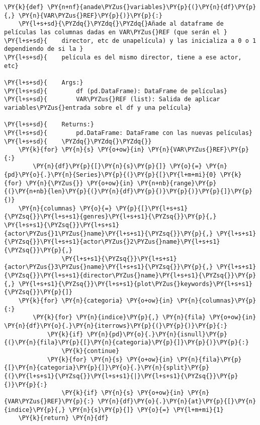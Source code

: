     \begin{tcolorbox}[breakable, size=fbox, boxrule=1pt, pad at break*=1mm,colback=cellbackground, colframe=cellborder]
\begin{Verbatim}[commandchars=\\\{\}]
\PY{k}{def} \PY{n+nf}{anade\PYZus{}variables}\PY{p}{(}\PY{n}{df}\PY{p}{,} \PY{n}{VAR\PYZus{}REF}\PY{p}{)}\PY{p}{:}
    \PY{l+s+sd}{\PYZdq{}\PYZdq{}\PYZdq{}Añade al dataframe de películas las columnas dadas en VAR\PYZus{}REF (que serán el }
\PY{l+s+sd}{    director, etc de unapelícula) y las inicializa a 0 o 1 dependiendo de si la }
\PY{l+s+sd}{    película es del mismo director, tiene a ese actor, etc}

\PY{l+s+sd}{    Args:}
\PY{l+s+sd}{        df (pd.DataFrame): DataFrame de películas}
\PY{l+s+sd}{        VAR\PYZus{}REF (list): Salida de aplicar variables\PYZus{}entrada sobre el df y una película}

\PY{l+s+sd}{    Returns:}
\PY{l+s+sd}{        pd.DataFrame: DataFrame con las nuevas películas}
\PY{l+s+sd}{    \PYZdq{}\PYZdq{}\PYZdq{}}
    \PY{k}{for} \PY{n}{s} \PY{o+ow}{in} \PY{n}{VAR\PYZus{}REF}\PY{p}{:} 
        \PY{n}{df}\PY{p}{[}\PY{n}{s}\PY{p}{]} \PY{o}{=} \PY{n}{pd}\PY{o}{.}\PY{n}{Series}\PY{p}{(}\PY{p}{[}\PY{l+m+mi}{0} \PY{k}{for} \PY{n}{\PYZus{}} \PY{o+ow}{in} \PY{n+nb}{range}\PY{p}{(}\PY{n+nb}{len}\PY{p}{(}\PY{n}{df}\PY{p}{)}\PY{p}{)}\PY{p}{]}\PY{p}{)}
    \PY{n}{columnas} \PY{o}{=} \PY{p}{[}\PY{l+s+s1}{\PYZsq{}}\PY{l+s+s1}{genres}\PY{l+s+s1}{\PYZsq{}}\PY{p}{,} \PY{l+s+s1}{\PYZsq{}}\PY{l+s+s1}{actor\PYZus{}1\PYZus{}name}\PY{l+s+s1}{\PYZsq{}}\PY{p}{,} \PY{l+s+s1}{\PYZsq{}}\PY{l+s+s1}{actor\PYZus{}2\PYZus{}name}\PY{l+s+s1}{\PYZsq{}}\PY{p}{,}
                \PY{l+s+s1}{\PYZsq{}}\PY{l+s+s1}{actor\PYZus{}3\PYZus{}name}\PY{l+s+s1}{\PYZsq{}}\PY{p}{,} \PY{l+s+s1}{\PYZsq{}}\PY{l+s+s1}{director\PYZus{}name}\PY{l+s+s1}{\PYZsq{}}\PY{p}{,} \PY{l+s+s1}{\PYZsq{}}\PY{l+s+s1}{plot\PYZus{}keywords}\PY{l+s+s1}{\PYZsq{}}\PY{p}{]}
    \PY{k}{for} \PY{n}{categoria} \PY{o+ow}{in} \PY{n}{columnas}\PY{p}{:}
        \PY{k}{for} \PY{n}{indice}\PY{p}{,} \PY{n}{fila} \PY{o+ow}{in} \PY{n}{df}\PY{o}{.}\PY{n}{iterrows}\PY{p}{(}\PY{p}{)}\PY{p}{:}
            \PY{k}{if} \PY{n}{pd}\PY{o}{.}\PY{n}{isnull}\PY{p}{(}\PY{n}{fila}\PY{p}{[}\PY{n}{categoria}\PY{p}{]}\PY{p}{)}\PY{p}{:}
                \PY{k}{continue}
            \PY{k}{for} \PY{n}{s} \PY{o+ow}{in} \PY{n}{fila}\PY{p}{[}\PY{n}{categoria}\PY{p}{]}\PY{o}{.}\PY{n}{split}\PY{p}{(}\PY{l+s+s1}{\PYZsq{}}\PY{l+s+s1}{|}\PY{l+s+s1}{\PYZsq{}}\PY{p}{)}\PY{p}{:}
                \PY{k}{if} \PY{n}{s} \PY{o+ow}{in} \PY{n}{VAR\PYZus{}REF}\PY{p}{:} \PY{n}{df}\PY{o}{.}\PY{n}{at}\PY{p}{[}\PY{n}{indice}\PY{p}{,} \PY{n}{s}\PY{p}{]} \PY{o}{=} \PY{l+m+mi}{1}            
    \PY{k}{return} \PY{n}{df}
\end{Verbatim}
\end{tcolorbox}

